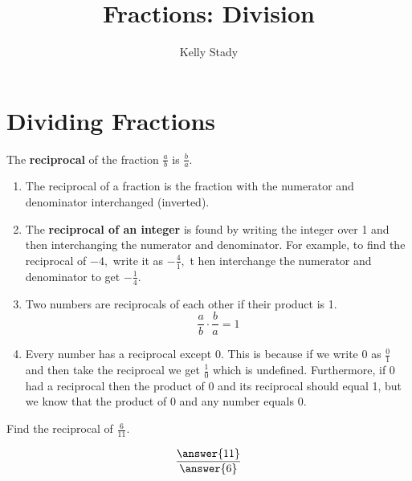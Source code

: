 \documentclass{ximera}[font=12pt]
\title{Fractions: Division}   %
\author{Kelly Stady}
\begin{document}
   

\begin{abstract}

\end{abstract}

\maketitle

\label{xim:FractionsDivision}


\section*{Dividing Fractions}


\begin{definition}

The \textbf{reciprocal} of the fraction $\displaystyle \frac{a}{b}$ is $\displaystyle \frac{b}{a}.$
\end{definition}


\begin{remark}

\begin{enumerate}
\item  The reciprocal of a fraction is the fraction with the numerator and
denominator interchanged (inverted).

\item The \textbf{reciprocal of an integer} is found by writing the integer over 1 and then interchanging 
the numerator and denominator. For example, to find the reciprocal of $-4,$ write it as $-\frac{4}{1},$ t
hen interchange the numerator and denominator to get $-\frac{1}{4}.$

\item Two numbers are reciprocals of each other if their product is 1.
\[ \frac{a}{b} \cdot \frac{b}{a} = 1 \]

\item Every number has a reciprocal except 0.  This is because if we write 0 as $\frac{0}{1}$
and then take the reciprocal we get $\frac{1}{0}$ which is undefined.  Furthermore, if 0 had a reciprocal
then the product of 0 and its reciprocal should equal 1, but we know that the product of 0 and any number equals 0.
\end{enumerate}

\end{remark}

\begin{problem}
Find the reciprocal of $\displaystyle \frac{6}{11}.$

\[ \frac{\answer{11}}{\answer{6}} \] 

\end{problem}
\end{document}
